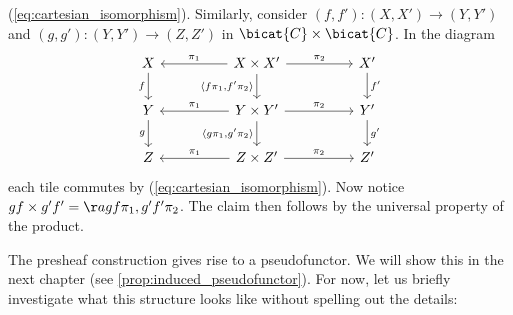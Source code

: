 \begin{example}
  (\ref{eq:cartesian_isomorphism}). Similarly, consider
  $(f,f'):(X,X')\to(Y,Y')$ and $(g,g'):(Y,Y')\to(Z,Z')$ in
  $\bicat{C}\times\bicat{C}$. In the diagram
  \begin{equation}
    \begin{tikzcd}
      X && {X\times X'} && {X'} \\
      Y && {Y\times Y'} && {Y'} \\
      Z && {Z\times Z'} && {Z'}
      \arrow["g"', from=2-1, to=3-1]
      \arrow["f"', from=1-1, to=2-1]
      \arrow["{f'}", from=1-5, to=2-5]
      \arrow["{g'}", from=2-5, to=3-5]
      \arrow["{\langle g\pi_1,g'\pi_2\rangle}"', from=2-3, to=3-3]
      \arrow["{\langle f\pi_1,f'\pi_2\rangle}"', from=1-3, to=2-3]
      \arrow["{\pi_1}"', from=1-3, to=1-1]
      \arrow["{\pi_2}", from=1-3, to=1-5]
      \arrow["{\pi_1}"', from=2-3, to=2-1]
      \arrow["{\pi_2}", from=2-3, to=2-5]
      \arrow["{\pi_1}"', from=3-3, to=3-1]
      \arrow["{\pi_2}", from=3-3, to=3-5]
    \end{tikzcd}
  \end{equation}
  each tile commutes by (\ref{eq:cartesian_isomorphism}). Now notice $gf\times g'f' =
  \aa{gf\pi_1,g'f'\pi_2}$. The claim then follows by the universal property of
  the product.
\end{example}

The presheaf construction gives rise to a pseudofunctor. We will show this in
the next chapter (see \ref{prop:induced_pseudofunctor}). For now, let us
briefly investigate what this structure looks like without spelling out the
details:

